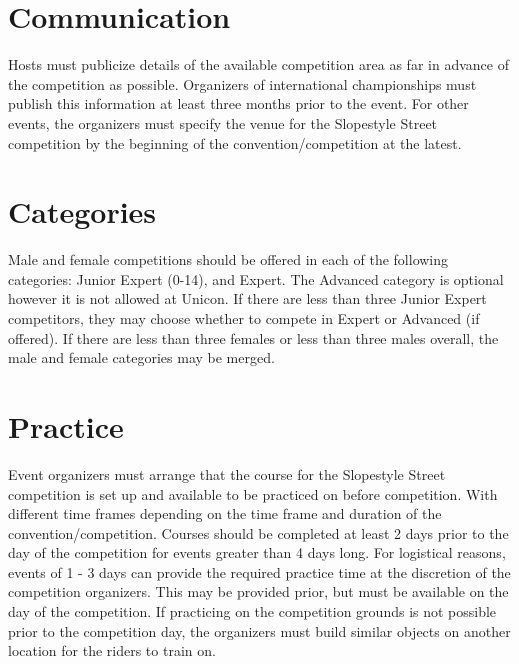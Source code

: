 \section{Communication}

Hosts must publicize details of the available competition area as far in advance of the competition as possible.
Organizers of international championships must publish this information at least three months prior to the event.
For other events, the organizers must specify the venue for the Slopestyle Street competition by the beginning of the convention/competition at the latest.

\section{Categories}
Male and female competitions should be offered in each of the following categories: Junior Expert (0-14), and Expert.
The Advanced category is optional however it is not allowed at Unicon.
If there are less than three Junior Expert competitors, they may choose whether to compete in Expert or Advanced (if offered).
If there are less than three females or less than three males overall, the male and female categories may be merged.

\section{Practice}

Event organizers must arrange that the course for the Slopestyle Street competition is set up and available to be practiced on before competition.
With different time frames depending on the time frame and duration of the convention/competition.
Courses should be completed at least 2 days prior to the day of the competition for events greater than 4 days long.
For logistical reasons, events of 1 - 3 days can provide the required practice time at the discretion of the competition organizers.
This may be provided prior, but must be available on the day of the competition.
If practicing on the competition grounds is not possible prior to the competition day, the organizers must build similar objects on another location for the riders to train on.
